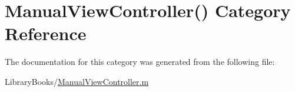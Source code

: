 \hypertarget{category_manual_view_controller_07_08}{}\section{Manual\+View\+Controller() Category Reference}
\label{category_manual_view_controller_07_08}


The documentation for this category was generated from the following file\+:\begin{DoxyCompactItemize}
\item 
Library\+Books/\hyperlink{_manual_view_controller_8m}{Manual\+View\+Controller.\+m}\end{DoxyCompactItemize}

